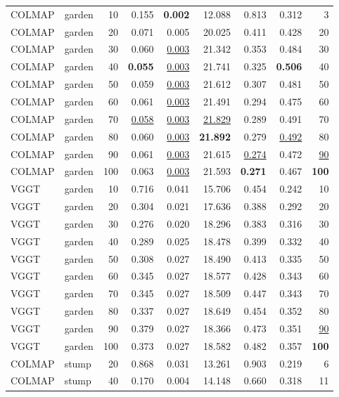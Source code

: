 \begin{table}[H]
\begin{tabular}{llrrrrrrr}
\midrule
COLMAP & garden & 10 & 0.155 & \textbf{0.002} & 12.088 & 0.813 & 0.312 & 3 \\
COLMAP & garden & 20 & 0.071 & 0.005 & 20.025 & 0.411 & 0.428 & 20 \\
COLMAP & garden & 30 & 0.060 & \underline{0.003} & 21.342 & 0.353 & 0.484 & 30 \\
COLMAP & garden & 40 & \textbf{0.055} & \underline{0.003} & 21.741 & 0.325 & \textbf{0.506} & 40 \\
COLMAP & garden & 50 & 0.059 & \underline{0.003} & 21.612 & 0.307 & 0.481 & 50 \\
COLMAP & garden & 60 & 0.061 & \underline{0.003} & 21.491 & 0.294 & 0.475 & 60 \\
COLMAP & garden & 70 & \underline{0.058} & \underline{0.003} & \underline{21.829} & 0.289 & 0.491 & 70 \\
COLMAP & garden & 80 & 0.060 & \underline{0.003} & \textbf{21.892} & 0.279 & \underline{0.492} & 80 \\
COLMAP & garden & 90 & 0.061 & \underline{0.003} & 21.615 & \underline{0.274} & 0.472 & \underline{90} \\
COLMAP & garden & 100 & 0.063 & \underline{0.003} & 21.593 & \textbf{0.271} & 0.467 & \textbf{100} \\
VGGT & garden & 10 & 0.716 & 0.041 & 15.706 & 0.454 & 0.242 & 10 \\
VGGT & garden & 20 & 0.304 & 0.021 & 17.636 & 0.388 & 0.292 & 20 \\
VGGT & garden & 30 & 0.276 & 0.020 & 18.296 & 0.383 & 0.316 & 30 \\
VGGT & garden & 40 & 0.289 & 0.025 & 18.478 & 0.399 & 0.332 & 40 \\
VGGT & garden & 50 & 0.308 & 0.027 & 18.490 & 0.413 & 0.335 & 50 \\
VGGT & garden & 60 & 0.345 & 0.027 & 18.577 & 0.428 & 0.343 & 60 \\
VGGT & garden & 70 & 0.345 & 0.027 & 18.509 & 0.447 & 0.343 & 70 \\
VGGT & garden & 80 & 0.337 & 0.027 & 18.649 & 0.454 & 0.352 & 80 \\
VGGT & garden & 90 & 0.379 & 0.027 & 18.366 & 0.473 & 0.351 & \underline{90} \\
VGGT & garden & 100 & 0.373 & 0.027 & 18.582 & 0.482 & 0.357 & \textbf{100} \\
\midrule
COLMAP & stump & 20 & 0.868 & 0.031 & 13.261 & 0.903 & 0.219 & 6 \\
COLMAP & stump & 40 & 0.170 & 0.004 & 14.148 & 0.660 & 0.318 & 11 \\

\end{tabular}
\end{table}
